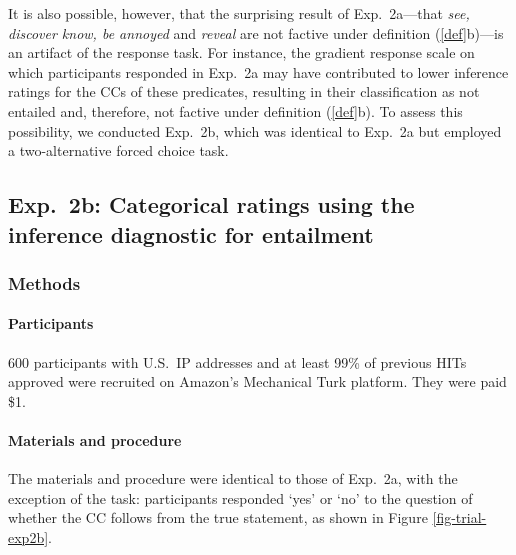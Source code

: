 \documentclass[11pt,fleqn]{article}
\newcommand{\6}{\mbox{$[\hspace*{-.6mm}[$}}
\newcommand{\9}{\mbox{$]\hspace*{-.6mm}]$}}
\begin{document}
It is also possible, however, that the surprising result of Exp.~2a---that {\em see, discover know, be annoyed} and {\em reveal} are not factive under definition (\ref{def}b)---is an artifact of the response task. For instance, the gradient response scale on which participants responded in Exp.~2a may have contributed to lower inference ratings for the CCs of these predicates, resulting in their classification as not entailed and, therefore, not factive under definition (\ref{def}b). To assess this possibility, we conducted Exp.~2b, which was identical to Exp.~2a but employed a two-alternative forced choice task.

\subsection{Exp.~2b: Categorical ratings using the inference diagnostic for entailment}

\subsubsection{Methods}

\paragraph{Participants} 600 participants with U.S.\ IP addresses and at least 99\% of previous HITs approved were recruited on Amazon's Mechanical Turk platform. They were paid \$1.

\paragraph{Materials and procedure} The materials and procedure were identical to those of Exp.~2a, with the exception of the task: participants responded `yes' or `no' to the question of whether the CC follows from the true statement, as shown in Figure \ref{fig-trial-exp2b}.
\end{document}
